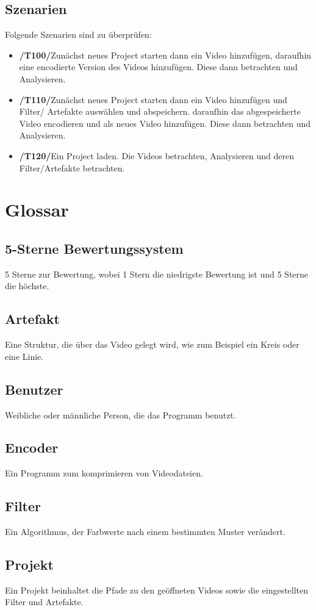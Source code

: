 \documentclass[parskip=full]{scrartcl}
\begin{document}
\subsection{Szenarien}
Folgende Szenarien sind zu überprüfen:
\begin{itemize}
\item[]\textbf{/T100/}\qquad Zunächst neues Project starten dann ein Video hinzufügen, daraufhin eine encodierte Version des Videos hinzufügen. Diese dann betrachten und Analysieren.
\item[]\textbf{/T110/}\qquad Zunächst neues Project starten dann ein Video hinzufügen und Filter/ Artefakte auswählen und abspeichern. daraufhin das abgespeicherte Video encodieren und als neues Video hinzufügen. Diese dann betrachten und Analysieren.
\item[]\textbf{/T120/}\qquad Ein Project laden. Die Videos betrachten, Analysieren und deren Filter/Artefakte betrachten.
\end{itemize}
\section{Glossar}
\subsection*{5-Sterne Bewertungssystem}  
5 Sterne zur Bewertung, wobei 1 Stern die niedrigste Bewertung ist und 5 Sterne die höchste.

\subsection*{Artefakt} Eine Struktur, die über das Video gelegt wird, wie zum Beispiel ein Kreis oder eine Linie.
\subsection*{Benutzer} 
Weibliche oder männliche Person, die das Programm benutzt.
\subsection*{Encoder} 
Ein Programm zum komprimieren von Videodateien.
\subsection*{Filter} 
Ein Algorithmus, der Farbwerte nach einem bestimmten Muster verändert.
\subsection*{Projekt} 
Ein Projekt beinhaltet die Pfade zu den geöffneten Videos sowie die eingestellten Filter und Artefakte.
\end{document}

